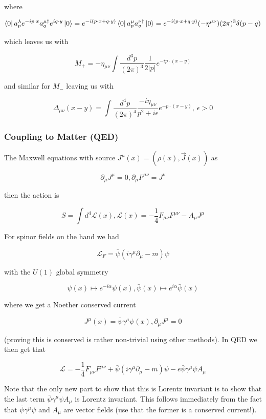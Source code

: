 \documentclass{article}
\theoremstyle{definition}
\begin{document}
where

$$ \bra{0} a_p^\lambda e^{-ip \cdot x} a_q^{\mu \dagger} e^{iq \cdot y} \ket{0}
      = e^{-i(p \cdot x + q \cdot y)} \bra{0} a_p^\mu a_q^{\nu \dagger} \ket{0}
      = e^{-i(p \cdot x + q \cdot y)} (- \eta^{\mu \nu}) (2\pi)^3 \delta(p - q) $$

which leaves us with

$$ M_+ = -\eta_{\mu \nu} \int \frac{d^3p}{(2\pi)^3} \frac{1}{2|p|} e^{-ip \cdot
  (x - y)} $$

and similar for $M_-$ leaving us with

$$ \Delta_{\mu \nu}(x - y) = \int \frac{d^4p}{(2\pi)^4} \frac{-i \eta_{\mu
    \nu}}{p^2 + i\epsilon} e^{-p \cdot (x - y)}, \ \epsilon > 0 $$

\subsubsection{Coupling to Matter (QED)}

The Maxwell equations with source $J^\mu(x) = (\rho(x), \vec{J}(x))$ as

$$ \partial_\mu J^\mu = 0, \partial_\mu F^{\mu \nu} = J^\nu $$

then the action is

$$ S = \int d^4 \mathcal{L}(x), \mathcal{L}(x) = -\frac{1}{4} F_{\mu \nu} F^{\mu
  \nu} - A_\mu J^\mu $$

For spinor fields on the hand we had

$$ \mathcal{L}_F = \bar{\psi} (i \gamma^\mu \partial_\mu - m) \psi $$

with the $U(1)$ global symmetry

$$ \psi(x) \mapsto e^{-i \alpha} \psi(x), \bar{\psi}(x) \mapsto e^{i \alpha}
\bar{\psi}(x) $$

where we get a Noether conserved current

$$ J^\mu(x) = \bar{\psi} \gamma^\mu \psi(x), \partial_\mu J^\mu = 0 $$

(proving this is conserved is rather non-trivial using other methods). In QED we
then get that

$$ \mathcal{L} = -\frac{1}{4} F_{\mu \nu} F^{\mu \nu} + \bar{\psi} (i \gamma^\mu
\partial_\mu - m) \psi - e \bar{\psi} \gamma^\mu \psi A_\mu $$

Note that the only new part to show that this is Lorentz invariant is to show
that the last term $\bar{\psi} \gamma^\mu \psi A_\mu$ is Lorentz invariant. This
follows immediately from the fact that $\bar{\psi} \gamma^\mu \psi$ and $A_\mu$
are vector fields (use that the former is a conserved current!).
\end{document}
